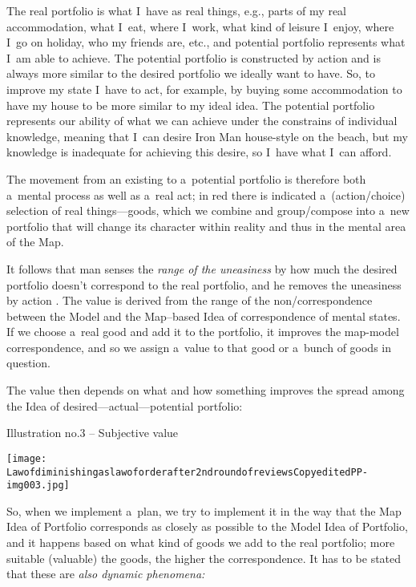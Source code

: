 The real portfolio is what I~have as real things, e.g., parts of my real accommodation, what I~eat, where I~work, what kind of leisure I~enjoy, where I~go on holiday, who my friends are, etc., and potential portfolio represents what I~am able to achieve. The potential portfolio is constructed by action and is always more similar to the desired portfolio we ideally want to have. So, to improve my state I~have to act, for example, by buying some accommodation to have my house to be more similar to my ideal idea. The potential portfolio represents our ability of what we can achieve under the constrains of individual knowledge, meaning that I~can desire Iron Man house-style on the beach, but my knowledge is inadequate for achieving this desire, so I~have what I~can afford.



The movement from an existing to a~potential portfolio is therefore both a~mental process as well as a~real act; in red there is indicated a~(action/choice) selection of real things---goods, which we combine and group/compose into a~new portfolio that will change its character within reality and thus in the mental area of the Map.



It follows that man senses the \textit{range of the uneasiness} by how much the desired portfolio doesn't correspond to the real portfolio, and he removes the uneasiness by action 
\parencite[compare to][sec.5.69 and 5.70]{}. %
 The value is derived from the range of the non/correspondence between the Model and the Map–based Idea of correspondence of mental states. If we choose a~real good and add it to the portfolio, it improves the map-model correspondence, and so we assign a~value to that good or a~bunch of goods in question.



The value then depends on what and how something improves the spread among the Idea of desired---actual---potential portfolio:



Illustration no.3 -- Subjective value



\texttt{[image: Lawofdiminishingaslawoforderafter2ndroundofreviewsCopyeditedPP-img003.jpg]}



So, when we implement a~plan, we try to implement it in the way that the Map Idea of Portfolio corresponds as closely as possible to the Model Idea of Portfolio, and it happens based on what kind of goods we add to the real portfolio; more suitable (valuable) the goods, the higher the correspondence. It has to be stated that these are \textit{also dynamic phenomena:}

